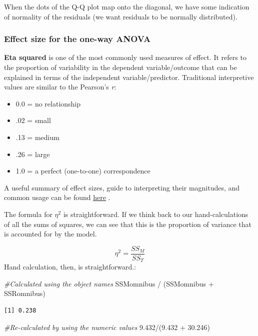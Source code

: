 \documentclass[
  11pt,
]{book}
\newenvironment{Shaded}{\begin{snugshade}}{\end{snugshade}}
\newcommand{\CommentTok}[1]{\textcolor[rgb]{0.56,0.35,0.01}{\textit{#1}}}
\newcommand{\FloatTok}[1]{\textcolor[rgb]{0.00,0.00,0.81}{#1}}
\newcommand{\NormalTok}[1]{#1}
\newcommand{\SpecialCharTok}[1]{\textcolor[rgb]{0.00,0.00,0.00}{#1}}
\providecommand{\tightlist}{%
  \setlength{\itemsep}{0pt}\setlength{\parskip}{0pt}}
\begin{document}
When the dots of the Q-Q plot map onto the diagonal, we have some indication of normality of the residuals (we want residuals to be normally distributed).

\hypertarget{effect-size-for-the-one-way-anova}{%
\subsubsection{Effect size for the one-way ANOVA}\label{effect-size-for-the-one-way-anova}}

\textbf{Eta squared} is one of the most commonly used measures of effect. It refers to the proportion of variability in the dependent variable/outcome that can be explained in terms of the independent variable/predictor. Traditional interpretive values are similar to the Pearson's \emph{r}:

\begin{itemize}
\tightlist
\item
  0.0 = no relationship
\item
  .02 = small
\item
  .13 = medium
\item
  .26 = large
\item
  1.0 = a perfect (one-to-one) correspondence
\end{itemize}

A useful summary of effect sizes, guide to interpreting their magnitudes, and common usage can be found \href{https://imaging.mrc-cbu.cam.ac.uk/statswiki/FAQ/effectSize}{here} \citep{watson_rules_2020}.

The formula for \(\eta^2\) is straightforward. If we think back to our hand-calculations of all the sums of squares, we can see that this is the proportion of variance that is accounted for by the model.

\[\eta ^{2}=\frac{SS_{M}}{SS_{T}}\]
Hand calculation, then, is straightforward.:

\begin{Shaded}
\begin{Highlighting}[]
\CommentTok{\#Calculated using the object names}
\NormalTok{SSMomnibus }\SpecialCharTok{/}\NormalTok{ (SSMomnibus }\SpecialCharTok{+}\NormalTok{ SSRomnibus)}
\end{Highlighting}
\end{Shaded}

\begin{verbatim}
[1] 0.238
\end{verbatim}

\begin{Shaded}
\begin{Highlighting}[]
\CommentTok{\#Re{-}calculated by using the numeric values}
\FloatTok{9.432}\SpecialCharTok{/}\NormalTok{(}\FloatTok{9.432} \SpecialCharTok{+} \FloatTok{30.246}\NormalTok{)}
\end{Highlighting}
\end{Shaded}
\end{document}
